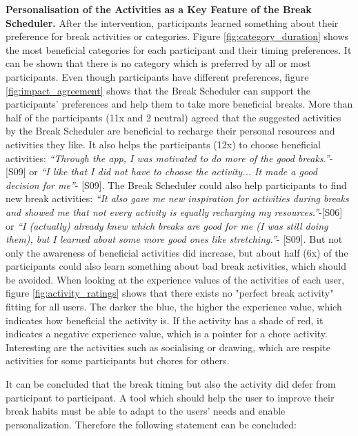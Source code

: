 \documentclass{hasel_thesis}
\begin{document}
\textbf{Personalisation of the Activities as a Key Feature of the Break Scheduler.}
After the intervention, participants learned something about their preference for break activities or categories. Figure \ref{fig:category_duration} shows the most beneficial categories for each participant and their timing preferences. It can be shown that there is no category which is preferred by all or most participants. Even though participants have different preferences, figure \ref{fig:impact_agreement} shows that the Break Scheduler can support the participants' preferences and help them to take more beneficial breaks. More than half of the participants (11x and 2 neutral) agreed that the suggested activities by the Break Scheduler are beneficial to recharge their personal resources and activities they like.  It also helps the participants (12x) to choose beneficial activities: \textit{“Through the app, I was motivated to do more of the good breaks.”}-[S09] or \textit{“I like that I did not have to choose the activity... It made a good decision for me”}- [S09]. The Break Scheduler could also help participants to find new break activities: \textit{“It also gave me new inspiration for activities during breaks and showed me that not every activity is equally recharging my resources.”}-[S06] or \textit{“I (actually) already knew which breaks are good for me (I was still doing them), but I learned about some more good ones like stretching.”}- [S09]. But not only the awareness of beneficial activities did increase, but about half (6x) of the participants could also learn something about bad break activities, which should be avoided. When looking at the experience values of the activities of each user, figure \ref{fig:activity_ratings} shows that there exists no "perfect break activity" fitting for all users. The darker the blue, the higher the experience value, which indicates how beneficial the activity is. If the activity has a shade of red, it indicates a negative experience value, which is a pointer for a chore activity. Interesting are the activities such as socialising or drawing, which are respite activities for some participants but chores for others. 



It can be concluded that the break timing but also the activity did defer from participant to participant. A tool which should help the user to improve their break habits must be able to adapt to the users' needs and enable personalization. Therefore the following statement can be concluded:
\end{document}
